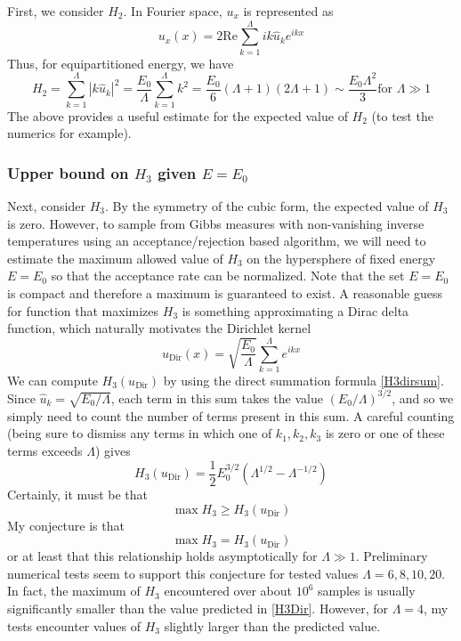 \documentclass[12pt]{article}
\newcommand{\abs}[1]{\left| #1 \right|}
\newcommand{\uhat}{\hat{u}}
\newcommand{\Real}{\text{Re}}
\newcommand{\sumk}{\sum_{k=1}^{\Lambda}}
\newcommand{\uDir}{u_{\text{Dir}}}
\begin{document}
First, we consider $H_2$. In Fourier space, $u_x$ is represented as
\begin{equation}
u_x(x) = 2 \Real \sumk i k \uhat_k e^{i k x}
\end{equation}
Thus, for equipartitioned energy, we have
\begin{equation}
H_2 = \sumk \abs{k \uhat_k}^2 = \frac{E_0}{\Lambda} \sumk k^2 = \frac{E_0}{6} (\Lambda+1)(2 \Lambda+1) \sim \frac{E_0 \Lambda^2}{3} \text{for } \Lambda \gg 1
\end{equation}
The above provides a useful estimate for the expected value of $H_2$ (to test the numerics for example).

\subsubsection{Upper bound on $H_3$ given $E=E_0$}

Next, consider $H_3$. By the symmetry of the cubic form, the expected value of $H_3$ is zero. However, to sample from Gibbs measures with non-vanishing inverse temperatures using an acceptance/rejection based algorithm, we will need to estimate the maximum allowed value of $H_3$ on the hypersphere of fixed energy $E = E_0$ so that the acceptance rate can be normalized. Note that the set $E=E_0$ is compact and therefore a maximum is guaranteed to exist. A reasonable guess for function that maximizes $H_3$ is something approximating a Dirac delta function, which naturally motivates the Dirichlet kernel
\begin{equation}
\label{Dkern}
\uDir(x) = \sqrt{\frac{E_0}{\Lambda}}\sumk e^{i k x}
\end{equation}
We can compute $H_3(\uDir)$ by using the direct summation formula \eqref{H3dirsum}. Since $\uhat_k = \sqrt{E_0/\Lambda}$, each term in this sum takes the value $(E_0/\Lambda)^{3/2}$, and so we simply need to count the number of terms present in this sum. A careful counting (being sure to dismiss any terms in which one of $k_1, k_2, k_3$ is zero or one of these terms exceeds $\Lambda$) gives
\begin{equation}
\label{H3Dir}
H_3(\uDir) = \frac{1}{2} E_0^{3/2} (\Lambda^{1/2} - \Lambda^{-1/2})
\end{equation}
Certainly, it must be that
\begin{equation}
\max H_3 \ge H_3(\uDir) 
\end{equation}
My conjecture is that
\begin{equation}
\max H_3 = H_3(\uDir) 
\end{equation}
or at least that this relationship holds asymptotically for $\Lambda \gg 1$.
Preliminary numerical tests seem to support this conjecture for tested values $\Lambda = 6, 8, 10, 20$. In fact, the maximum of $H_3$ encountered over about $10^6$ samples is usually significantly smaller than the value predicted in \eqref{H3Dir}. However, for $\Lambda = 4$, my tests encounter values of $H_3$ slightly larger than the predicted value.
\end{document}
